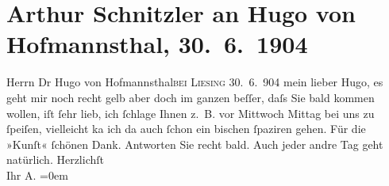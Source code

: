 

         
         \renewcommand{\erwaehntePersonen}{Personen: Hugo von Hofmannsthal}
         \renewcommand{\erwaehnteOrte}{Orte: Rodaun, Wien, XVIII., Währing, XXIII., Liesing}
         \renewcommand{\erwaehnteWerke}{Werke: Kunst und Künstler}
               \section[Arthur Schnitzler an Hugo von Hofmannsthal, 30. 6. 1904]{ Arthur Schnitzler an Hugo von Hofmannsthal, 30. 6. 1904}\nopagebreak{}\rehead{ }\begin{ledgroupsized}[t]{13cm}\normalsize\beginnumbering \toendnotes[C]{\smallbreak\pagebreak[2]} 
\toendnotes[C]{\smallbreak}\pstart{}{\pb}Herrn Dr Hugo von Hofmannsthal\pend{}\pstart{}\textsc{\label{K_L01412-1v}\label{K_L01412-1h}}\pend{}\pstart{}\textsc{bei Liesing}\pend{}{\bigskip}\pstart
           \raggedleft{}{\pb}30. 6. 904\pend
           \pstart
           mein lieber Hugo, es geht mir noch recht gelb aber doch im ganzen
               beſſer, daſs Sie bald kommen wollen, iſt ſehr lieb, ich ſchlage Ihnen z. B. vor
                  Mittwoch{ }Mittag bei uns zu ſpeiſen, vielleicht ka{\geminationn}
               ich da auch ſchon ein bischen ſpaziren gehen. Für die »Kunſt« ſchönen Dank. Antworten Sie recht bald. Auch jeder andre
               Tag geht natürlich.\pend
           \pstart
           Herzlichſt{\\[\baselineskip]}Ihr \spacefill\mbox{A.}\pend
           \leftskip=0em{}
         
         \endnumbering{}\end{ledgroupsized}  \newcommand{\dateiname}{L01412}\newcommand{\titel}{Arthur Schnitzler an Hugo von Hofmannsthal, 30. 6. 1904}\newcommand{\editorInnen}{Martin Anton Müller und Gerd-Hermann Susen}
      